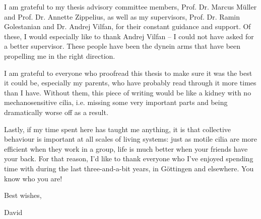 I am grateful to my thesis advisory committee members, Prof. Dr. Marcus Müller and Prof. Dr. Annette Zippelius, as well as my supervisors, Prof. Dr. Ramin Golestanian and Dr. Andrej Vilfan, for their constant guidance and support. Of these, I would especially like to thank Andrej Vilfan -- I could not have asked for a better supervisor. These people have been the dynein arms that have been propelling me in the right direction.

I am grateful to everyone who proofread this thesis to make sure it was the best it could be, especially my parents, who have probably read through it more times than I have. Without them, this piece of writing would be like a kidney with no mechanosensitive cilia, i.e. missing some very important parts and being dramatically worse off as a result.

Lastly, if my time spent here has taught me anything, it is that collective behaviour is important at all scales of living systems: just as motile cilia are more efficient when they work in a group, life is much better when your friends have your back. For that reason, I'd like to thank everyone who I've enjoyed spending time with during the last three-and-a-bit years, in Göttingen and elsewhere. You know who you are!

\vspace{1cm}

Best wishes,

David